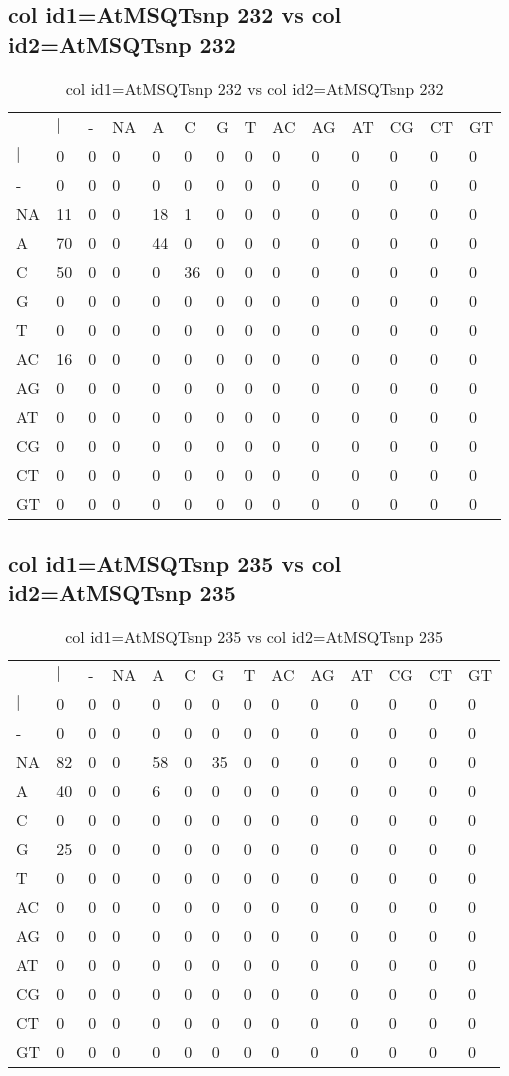 \subsection{col id1=AtMSQTsnp 232 vs col id2=AtMSQTsnp 232}
\begin{center}
\begin{longtable}{|l|l|l|l|l|l|l|l|l|l|l|l|l|l|}
\caption{col id1=AtMSQTsnp 232 vs col id2=AtMSQTsnp 232} \label{table_dm598}\\
\hline
\\
\hline
&$|$&-&NA&A&C&G&T&AC&AG&AT&CG&CT&GT\\
$|$&0&0&0&0&0&0&0&0&0&0&0&0&0\\
-&0&0&0&0&0&0&0&0&0&0&0&0&0\\
NA&11&0&0&18&1&0&0&0&0&0&0&0&0\\
A&70&0&0&44&0&0&0&0&0&0&0&0&0\\
C&50&0&0&0&36&0&0&0&0&0&0&0&0\\
G&0&0&0&0&0&0&0&0&0&0&0&0&0\\
T&0&0&0&0&0&0&0&0&0&0&0&0&0\\
AC&16&0&0&0&0&0&0&0&0&0&0&0&0\\
AG&0&0&0&0&0&0&0&0&0&0&0&0&0\\
AT&0&0&0&0&0&0&0&0&0&0&0&0&0\\
CG&0&0&0&0&0&0&0&0&0&0&0&0&0\\
CT&0&0&0&0&0&0&0&0&0&0&0&0&0\\
GT&0&0&0&0&0&0&0&0&0&0&0&0&0\\
\hline
\end{longtable}
\end{center}

\subsection{col id1=AtMSQTsnp 235 vs col id2=AtMSQTsnp 235}
\begin{center}
\begin{longtable}{|l|l|l|l|l|l|l|l|l|l|l|l|l|l|}
\caption{col id1=AtMSQTsnp 235 vs col id2=AtMSQTsnp 235} \label{table_dm600}\\
\hline
\\
\hline
&$|$&-&NA&A&C&G&T&AC&AG&AT&CG&CT&GT\\
$|$&0&0&0&0&0&0&0&0&0&0&0&0&0\\
-&0&0&0&0&0&0&0&0&0&0&0&0&0\\
NA&82&0&0&58&0&35&0&0&0&0&0&0&0\\
A&40&0&0&6&0&0&0&0&0&0&0&0&0\\
C&0&0&0&0&0&0&0&0&0&0&0&0&0\\
G&25&0&0&0&0&0&0&0&0&0&0&0&0\\
T&0&0&0&0&0&0&0&0&0&0&0&0&0\\
AC&0&0&0&0&0&0&0&0&0&0&0&0&0\\
AG&0&0&0&0&0&0&0&0&0&0&0&0&0\\
AT&0&0&0&0&0&0&0&0&0&0&0&0&0\\
CG&0&0&0&0&0&0&0&0&0&0&0&0&0\\
CT&0&0&0&0&0&0&0&0&0&0&0&0&0\\
GT&0&0&0&0&0&0&0&0&0&0&0&0&0\\
\hline
\end{longtable}
\end{center}

